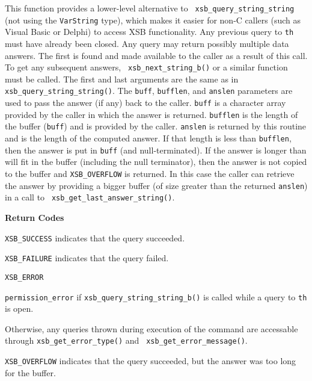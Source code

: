 \begin{description}
\item[{\mbox{\tt {\small int xsb\_query\_string\_string\_b(th\_context *th,char *query,char *buff,int bufflen,int *anslen,char *sep)}}}]
%
This function provides a lower-level alternative to {\tt
  xsb\_query\_string\_string} (not using the {\tt VarString} type),
which makes it easier for non-C callers (such as Visual Basic or
Delphi) to access XSB functionality.  Any previous query to {\tt th}
must have already been closed.  Any query may return possibly multiple
data answers.  The first is found and made available to the caller as
a result of this call.  To get any subsequent answers, {\tt
  xsb\_next\_string\_b()} or a similar function must be called.  The
first and last arguments are the same as in {\tt
  xsb\_query\_string\_string()}.  The \verb|buff|, \verb|bufflen|, and
\verb|anslen| parameters are used to pass the answer (if any) back to
the caller.  \verb|buff| is a character array provided by the caller
in which the answer is returned.  \verb|bufflen| is the length of the
buffer (\verb|buff|) and is provided by the caller.  \verb|anslen| is
returned by this routine and is the length of the computed answer.  If
that length is less than \verb|bufflen|, then the answer is put in
\verb|buff| (and null-terminated).  If the answer is longer than will
fit in the buffer (including the null terminator), then the answer is
not copied to the buffer and {\tt XSB\_OVERFLOW} is returned.  In this
case the caller can retrieve the answer by providing a bigger buffer
(of size greater than the returned \verb|anslen|) in a call to {\tt
  xsb\_get\_last\_answer\_string()}.

{\bf Return Codes}  
\bi
\item {\tt XSB\_SUCCESS} indicates that the query succeeded.
%
\item {\tt XSB\_FAILURE} indicates that the query failed.
%
\item {\tt XSB\_ERROR} 
\bi
\item {\tt permission\_error} if {\tt xsb\_query\_string\_string\_b()}
  is called while a query to {\tt th} is open.
%
\item Otherwise, any queries thrown during execution of the command
  are accessable through {\tt xsb\_get\_error\_type()} and {\tt
    xsb\_get\_error\_message()}.
\ei

\item {\tt XSB\_OVERFLOW} indicates that the query succeeded, but the
  answer was too long for the buffer.
%
\ei


\end{description}
